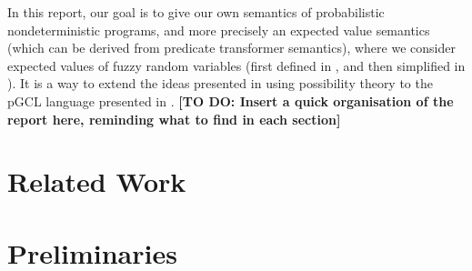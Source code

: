 \documentclass[a4paper,10pt]{llncs}
\newcommand\todo[1]{{\color{red}\textbf{[TO DO:  #1]}}}
\begin{document}
In this report, our goal is to give our own semantics of probabilistic nondeterministic programs, and more precisely an expected value semantics (which can be derived from predicate transformer semantics), where we consider expected values of fuzzy random variables (first defined in \cite{PuriRal86}, and then simplified in \cite{Shapiro09}). It is a way to extend the ideas presented in \cite{WuChen08,WuChen11,WuChen12} using possibility theory to the pGCL language presented in \cite{McIver05}.\newline
\todo{Insert a quick organisation of the report here, reminding what to find in each section}

\section{Related Work}
\label{sec:related}

\section{Preliminaries}
\label{sec:preliminaries}
\end{document}
